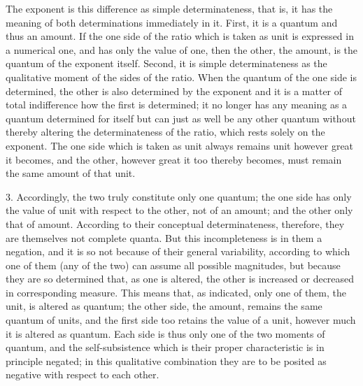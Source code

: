 The exponent is this difference as simple determinateness,
that is, it has the meaning of both
determinations immediately in it.
First, it is a quantum and thus an amount.
If the one side of the ratio which is taken as
unit is expressed in a numerical one,
and has only the value of one,
then the other, the amount, is
the quantum of the exponent itself.
Second, it is simple determinateness as
the qualitative moment of the sides of the ratio.
When the quantum of the one side is determined,
the other is also determined by the exponent
and it is a matter of total indifference
how the first is determined;
it no longer has any meaning
as a quantum determined for itself
but can just as well be any other
quantum without thereby altering
the determinateness of the ratio,
which rests solely on the exponent.
The one side which is taken as unit always
remains unit however great it becomes,
and the other, however great it too thereby becomes,
must remain the same amount of that unit.

3. Accordingly, the two truly constitute only one quantum;
the one side has only the value of unit
with respect to the other, not of an amount;
and the other only that of amount.
According to their conceptual determinateness,
therefore, they are themselves not complete quanta.
But this incompleteness is in them a negation,
and it is so not because of their general variability,
according to which one of them (any of the two)
can assume all possible magnitudes,
but because they are so determined that, as one is altered,
the other is increased or decreased in corresponding measure.
This means that, as indicated, only one of them,
the unit, is altered as quantum;
the other side, the amount, remains the same quantum of units,
and the first side too retains the value of a unit,
however much it is altered as quantum.
Each side is thus only one of the two moments of quantum,
and the self-subsistence which is their proper characteristic
is in principle negated;
in this qualitative combination they are to be
 posited as negative with respect to each other.

